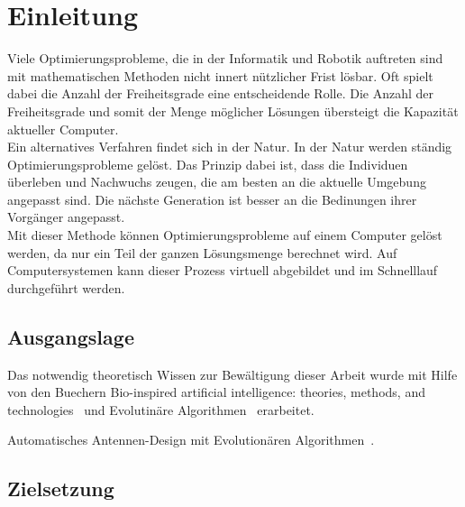 %
%


\chapter{Einleitung}

  Viele Optimierungsprobleme,
  die in der Informatik und Robotik auftreten sind mit mathematischen Methoden nicht innert nützlicher Frist lösbar.
  Oft spielt dabei die Anzahl der Freiheitsgrade eine entscheidende Rolle.
  Die Anzahl der Freiheitsgrade und somit der Menge möglicher Lösungen übersteigt die Kapazität aktueller Computer.
  \\
  Ein alternatives Verfahren findet sich in der Natur. In der Natur werden ständig Optimierungsprobleme gelöst.
  Das Prinzip dabei ist, dass die Individuen überleben und Nachwuchs zeugen,
  die am besten an die aktuelle Umgebung angepasst sind.
  Die nächste Generation ist besser an die Bedinungen ihrer Vorgänger angepasst. %
  \\
  Mit dieser Methode können Optimierungsprobleme auf einem Computer gelöst werden,
  da nur ein Teil der ganzen Lösungsmenge berechnet wird.
  Auf Computersystemen kann dieser Prozess virtuell abgebildet und im Schnelllauf durchgeführt werden.
  \\

\section{Ausgangslage}

Das notwendig theoretisch Wissen zur Bewältigung dieser Arbeit wurde mit Hilfe von den Buechern
Bio-inspired artificial intelligence: theories, methods, and technologies~\cite{book:bioInspired} und
Evolutinäre Algorithmen~\cite{book:evAlgo} erarbeitet.

Automatisches Antennen-Design mit Evolutionären Algorithmen~\cite{Hornby2006}.



\section{Zielsetzung}

